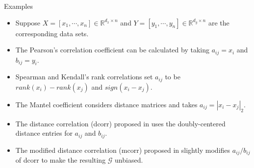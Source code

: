 \documentclass{beamer}
\newcommand{\G}{\mathcal{G}}
\newcommand{\Real}{\mathbb{R}}
\begin{document}
\begin{frame}{Examples}
\begin{itemize}[<+->]
\item Suppose $X=[x_{1},\cdots, x_{n}] \in \Real^{d_{x} \times n}$ and $Y=[y_{1},\cdots, y_{n}] \in \Real^{d_{y} \times n}$ are the corresponding data sets.
\item The Pearson's correlation coefficient can be calculated by taking $a_{ij}=x_i$ and $b_{ij}=y_i$.
\item Spearman and Kendall's rank correlations set $a_{ij}$ to be $rank(x_i)-rank(x_j)$ and $sign(x_i-x_j)$.
\item The Mantel coefficient \cite{Mantel1967} considers distance matrices and takes $a_{ij}=|x_i-x_j|_{2}$.
\item The distance correlation (dcorr) proposed in \cite{SzekelyRizzoBakirov2007} uses the doubly-centered distance entries for $a_{ij}$ and $b_{ij}$.
\item The modified distance correlation (mcorr) proposed in \cite{SzekelyRizzo2013a} slightly modifies $a_{ij}/b_{ij}$ of dcorr to make the resulting $\G$ unbiased.
\end{itemize}
\end{frame}
\end{document}
